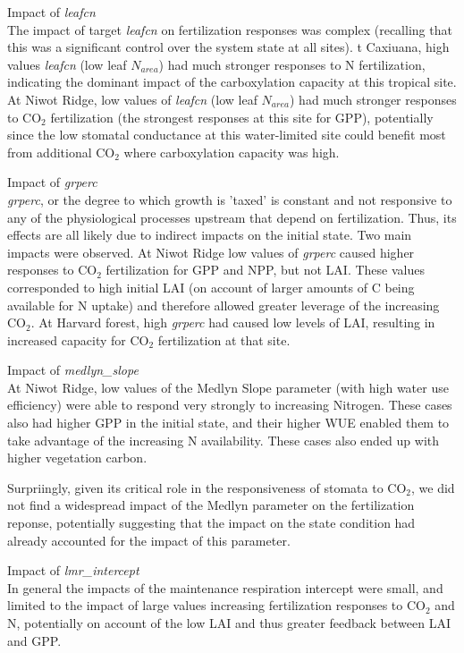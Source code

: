 \documentclass[draft,linenumbers]{agujournal}
\begin{document}
Impact of \emph{leafcn}\\
The impact of target \emph{leafcn} on fertilization responses was complex (recalling that this was a significant control over the system state at all sites). t Caxiuana, high values \emph{leafcn} (low leaf  $N_{area}$) had much stronger responses to N fertilization, indicating the dominant impact of the carboxylation capacity at this tropical site.  At Niwot Ridge, low values of \emph{leafcn} (low leaf  $N_{area}$) had much stronger responses to CO$_{2}$ fertilization (the strongest responses at this site for GPP), potentially since the low stomatal conductance at this water-limited site could benefit most from additional CO$_{2}$ where carboxylation capacity was high. 

Impact of \emph{grperc}\\
\emph{grperc}, or the degree to which growth is 'taxed' is constant and not responsive to any of the physiological processes upstream that depend on fertilization. Thus, its effects are all likely due to indirect impacts on the initial state. Two main impacts were observed. At Niwot Ridge low values of \emph{grperc} caused higher responses to CO$_{2}$ fertilization for GPP and NPP, but not LAI. These values corresponded to high initial LAI (on account of larger amounts of C being available for N uptake) and therefore allowed greater leverage of the increasing CO$_{2}$.  At Harvard forest, high \emph{grperc} had caused low levels of LAI, resulting in increased capacity for CO$_{2}$ fertilization at that site.

Impact of \emph{medlyn\_slope}\\
At Niwot Ridge, low values of the Medlyn Slope parameter (with high water use efficiency) were able to respond very strongly to increasing Nitrogen. These cases also had higher GPP in the initial state, and their higher WUE enabled them to take advantage of the increasing N availability.   These cases also ended up with higher vegetation carbon. 

Surpriingly, given its critical role in the responsiveness of stomata to CO$_{2}$, we did not find a widespread impact of the Medlyn parameter on the fertilization reponse, potentially suggesting that the impact on the state condition had already accounted for the impact of this parameter. 

Impact of \emph{lmr\_intercept}\\
In general the impacts of the maintenance respiration intercept were small, and limited to the impact of large values increasing fertilization responses to CO$_{2}$ and N, potentially on account of the low LAI and thus greater feedback between LAI and GPP. 
\end{document}
